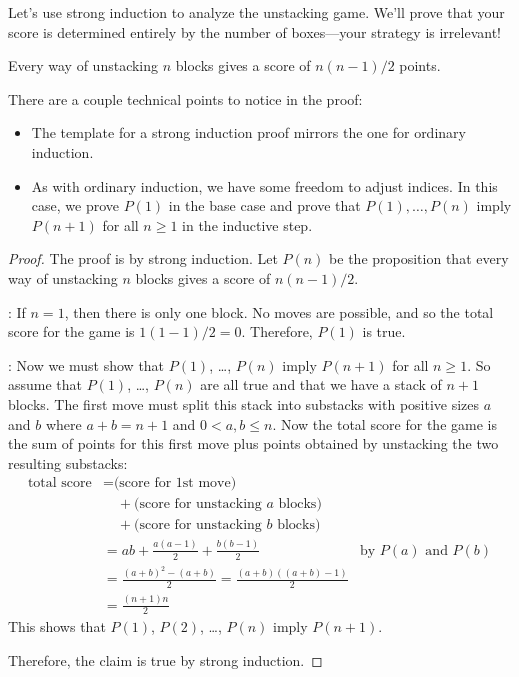 \iffalse
You will see in class how to use strong induction to analyze this game of
blocks.
\fi

Let's use strong induction to analyze the unstacking game.  We'll prove
that your score is determined entirely by the number of boxes---your
strategy is irrelevant!

\begin{theorem}\label{stacking}
Every way of unstacking $n$ blocks gives a score of $n(n-1)/2$ points.
\end{theorem}

There are a couple technical points to notice in the proof:

\begin{itemize}

\item The template for a strong induction proof mirrors the one for
  ordinary induction.

\item As with ordinary induction, we have some freedom to adjust indices.
In this case, we prove $P(1)$ in the base case and prove that $P(1),
\dots, P(n)$ imply $P(n+1)$ for all $n \geq 1$ in the inductive step.

\end{itemize}

\begin{proof}
The proof is by strong induction.  Let $P(n)$ be the proposition that
every way of unstacking $n$ blocks gives a score of $n(n-1)/2$.

: If $n = 1$, then there is only one
block.  No moves are possible, and so the total score for the game is
$1(1 - 1)/2 = 0$.  Therefore, $P(1)$ is true.

: Now we must show that $P(1)$, \dots, $P(n)$ imply
$P(n+1)$ for all $n \geq 1$.  So assume that $P(1)$, \dots, $P(n)$ are all
true and that we have a stack of $n+1$ blocks.  The first move must split
this stack into substacks with positive sizes $a$ and $b$ where $a+b =
n+1$ and $0<a,b\leq n$.  Now the total score for the game is the sum of
points for this first move plus points obtained by unstacking the two
resulting substacks:
%
\begin{align*}
\text{total score}
    & = \text{(score for 1st move)} \\
    & \quad + \text{(score for unstacking $a$ blocks)} \\
    & \quad + \text{(score for unstacking $b$ blocks)} \\
    & = ab + \frac{a(a-1)}{2} + \frac{b(b-1)}{2} & \text{by $P(a)$ and $P(b)$}\\
    & = \frac{(a+b)^2-(a+b)}{2} = \frac{(a+b)((a+b)-1)}{2}\\
    & = \frac{(n+1)n}{2}
\end{align*}
%
This shows that $P(1)$, $P(2)$, \dots, $P(n)$ imply $P(n+1)$.

Therefore, the claim is true by strong induction.
\end{proof}

